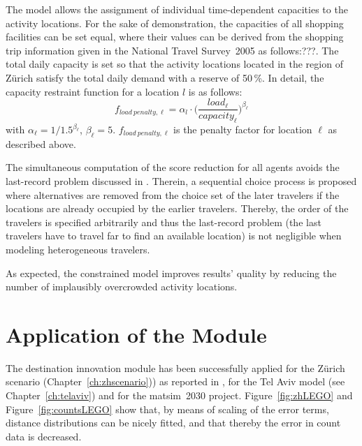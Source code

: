The model allows the assignment of individual time-dependent capacities to the activity locations. For the sake of demonstration, the capacities of all shopping facilities can be set equal, where their values can be derived from the shopping trip information given in the National Travel Survey~2005 {\orange as follows:???}. The total daily capacity is set so that the activity locations located in the region of Zürich satisfy the total daily demand with a reserve of 50\,\%. In detail, the capacity restraint function for a location $l$ is as follows:
\[
f_{load\ penalty, \ell}=\alpha_l \cdot \Bigg(\frac{load_{\ell}}{capacity_{\ell}}\Bigg)^{\beta_\ell}
\]
with $\alpha_\ell=1/1.5^{\beta_\ell}$, $\beta_\ell=5$. $f_{load\ penalty, \ell}$ is the penalty factor for location $\ell$ as described above.

The simultaneous computation of the score reduction for all agents avoids the last-record problem discussed in \citet[][]{VovshaEtAl_TRR_2002}. 
Therein, a sequential choice process is proposed where alternatives are removed from the choice set of the later travelers if the locations are already occupied by the earlier travelers. 
Thereby, the order of the travelers is specified arbitrarily and thus the last-record problem (the last travelers have to travel far to find an available location) is not negligible when modeling heterogeneous travelers. 

As expected, the constrained model improves results' quality by reducing the number of implausibly overcrowded activity locations.

\section{Application of the Module}
The destination innovation module has been successfully applied for the Zürich scenario (Chapter~\ref{ch:zhscenario})) as reported in \citet[][p.99]{Horni_PhDThesis_2013}, for the Tel Aviv model (see Chapter~\ref{ch:telaviv}) and for the \gls{matsim}~2030 project. 
Figure~\ref{fig:zhLEGO} and Figure~\ref{fig:countsLEGO} show that, by means of scaling of the error terms, distance distributions can be nicely fitted, and that thereby the error in count data is decreased.

